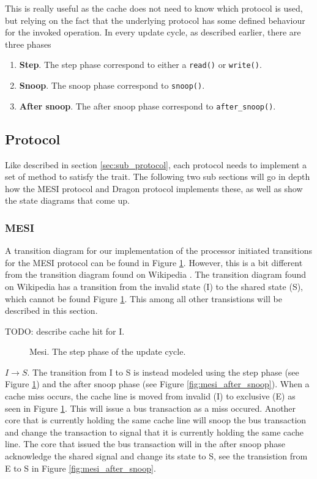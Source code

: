 This is really useful as the cache does not need to know which protocol is used, but relying on the fact that the underlying protocol has some defined behaviour for the invoked operation.
In every update cycle, as described earlier, there are three phases

\begin{enumerate}
    \item \textbf{Step}. The step phase correspond to either a \texttt{read()} or \texttt{write()}.
    \item \textbf{Snoop}. The snoop phase correspond to \texttt{snoop()}.
    \item \textbf{After snoop}. The after snoop phase correspond to \texttt{after\_snoop()}.
\end{enumerate}

\subsection{Protocol}
Like described in section \ref{sec:sub_protocol}, each protocol needs to implement a set of method
to satisfy the trait.  The following two sub sections will go in depth how the MESI protocol and
Dragon protocol implements these, as well as show the state diagrams that come up.

\subsubsection{MESI}

A transition diagram for our implementation of the processor initiated transitions for the MESI protocol can be found in Figure \ref{fig:mesi}.
However, this is a bit different from the transition diagram found on Wikipedia \cite{mesi_wiki}.
The transition diagram found on Wikipedia has a transition from the invalid state (I) to the shared state (S), which cannot be found Figure \ref{fig:mesi}.
This among all other transistions will be described in this section.

TODO: describe cache hit for I. 


\begin{figure}[H]
    \centering
    \caption{Mesi. The step phase of the update cycle.}
    \label{fig:mesi}
\end{figure}

$I \to S$. 
The transition from I to S is instead modeled using the step phase (see Figure \ref{fig:mesi}) and the after snoop phase (see Figure \ref{fig:mesi_after_snoop}).
When a cache miss occurs, the cache line is moved from invalid (I) to exclusive (E) as seen in Figure \ref{fig:mesi}.
This will issue a bus transaction as a miss occured.
Another core that is currently holding the same cache line will snoop the bus transaction and change the transaction to signal that it is currently holding the same cache line.
The core that issued the bus transaction will in the after snoop phase acknowledge the shared signal and change its state to S, see the transistion from E to S in Figure \ref{fig:mesi_after_snoop}.

